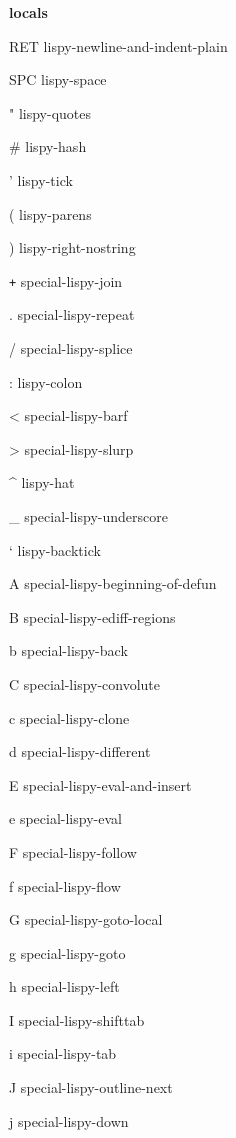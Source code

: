 \documentclass[a4paper,10pt]{article}
\renewcommand\section[1]{\bigskip\par\textbf{\large#1}\medskip}
\newcommand\keyify[1]{\keys{\ttfamily#1}}
\begin{document}
\begin{multicols*}{3}
\section{locals}
\begin{keylist}[labelwidth=\widthof{\keyify{RET}}]
	\item[RET] lispy-newline-and-indent-plain
	\item[SPC] lispy-space
	\item["] lispy-quotes
	\item[\#] lispy-hash
	\item['] lispy-tick
	\item[(] lispy-parens
	\item[)] lispy-right-nostring
	\item[\texttt{+}] special-lispy-join
	\item[.] special-lispy-repeat
	\item[/] special-lispy-splice
	\item[:] lispy-colon
	\item[<] special-lispy-barf
	\item[>] special-lispy-slurp
	\item[\textasciicircum] lispy-hat
	\item[\_] special-lispy-underscore
	\item[`] lispy-backtick
	\item[A] special-lispy-beginning-of-defun
	\item[B] special-lispy-ediff-regions
	\item[b] special-lispy-back
	\item[C] special-lispy-convolute
	\item[c] special-lispy-clone
	\item[d] special-lispy-different
	\item[E] special-lispy-eval-and-insert
	\item[e] special-lispy-eval
	\item[F] special-lispy-follow
	\item[f] special-lispy-flow
	\item[G] special-lispy-goto-local
	\item[g] special-lispy-goto
	\item[h] special-lispy-left
	\item[I] special-lispy-shifttab
	\item[i] special-lispy-tab
	\item[J] special-lispy-outline-next
	\item[j] special-lispy-down

\end{keylist}
\end{multicols*}
\end{document}
